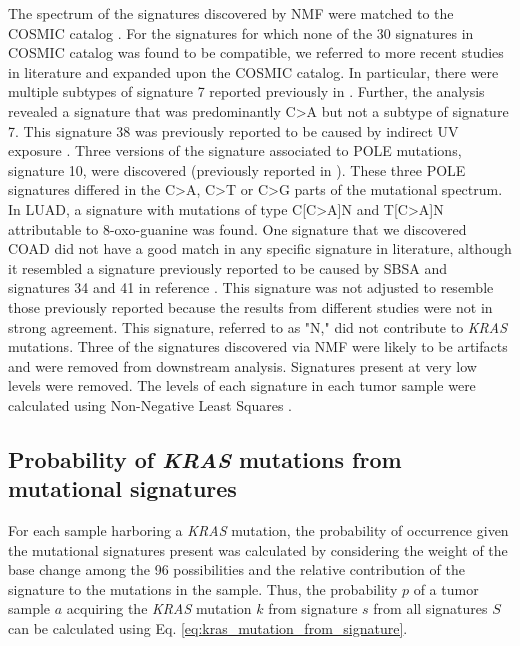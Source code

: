 \documentclass[english, 10pt, letterpaper]{article}
\newcommand{\KRAS}{\emph{KRAS}}
\begin{document}
The spectrum of the signatures discovered by NMF were matched to the COSMIC catalog \cite{Tate2019}.
For the signatures for which none of the 30 signatures in COSMIC catalog was found to be compatible, we referred to more recent studies in literature and expanded upon the COSMIC catalog. 
In particular, there were multiple subtypes of signature 7 reported previously in \cite{Hayward2017Whole-genomeSubtypes., Alexandrov2020TheCancer.}.
Further, the analysis revealed a signature that was predominantly C>A but not a subtype of signature 7.
This signature 38 was previously reported to be caused by indirect UV exposure \cite{Alexandrov2020TheCancer.}. 
Three versions of the signature associated to POLE mutations, signature 10, were discovered (previously reported in \cite{Alexandrov2020TheCancer.}).
These three POLE signatures differed in the C>A, C>T or C>G parts of the mutational spectrum. 
In LUAD, a signature with mutations of type C[C>A]N and T[C>A]N attributable to 8-oxo-guanine \cite{Alexandrov2020TheCancer.} was found. 
One signature that we discovered COAD did not have a good match in any specific signature in literature, although it resembled a signature previously reported to be caused by SBSA \cite{Lee-Six2019} and signatures 34 and 41 in reference \cite{Alexandrov2020TheCancer.}. 
This signature was not adjusted to resemble those previously reported because the results from different studies were not in strong agreement.
This signature, referred to as "N," did not contribute to \KRAS{} mutations.
Three of the signatures discovered via NMF were likely to be artifacts \cite{Costello2013DiscoveryPreparation.} and were removed from downstream analysis. 
Signatures present at very low levels were removed. 
The levels of each signature in each tumor sample were calculated using Non-Negative Least Squares \cite{Gulhan2019DetectingSamples.}.


\subsection*{Probability of \KRAS{} mutations from mutational signatures}

For each sample harboring a \KRAS{} mutation, the probability of occurrence given the mutational signatures present was calculated by considering the weight of the base change among the 96 possibilities and the relative contribution of the signature to the mutations in the sample. 
Thus, the probability $p$ of a tumor sample $a$ acquiring the \KRAS{} mutation $k$ from signature $s$ from all signatures $S$ can be calculated using Eq. \ref{eq:kras_mutation_from_signature}.
\end{document}

